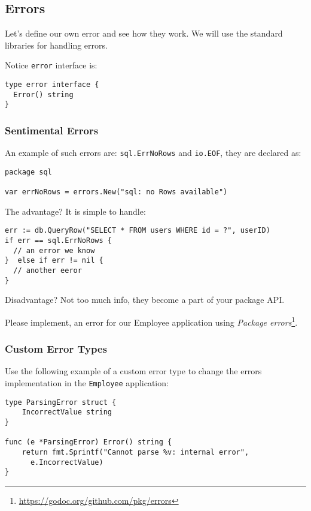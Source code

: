 \documentclass[11pt, letterpaper]{article}
\begin{document}
\subsection{Errors}
Let's define our own error and see how they work. We will use the standard libraries for handling errors.

Notice \verb|error| interface is:

\begin{verbatim}
type error interface {
  Error() string
}
\end{verbatim}

\subsubsection{Sentimental Errors}

An example of such errors are: \texttt{sql.ErrNoRows} and \texttt{io.EOF}, they are declared as:

\begin{verbatim}
package sql

var errNoRows = errors.New("sql: no Rows available")
\end{verbatim}

The advantage? It is simple to handle:

\begin{verbatim}
err := db.QueryRow("SELECT * FROM users WHERE id = ?", userID)
if err == sql.ErrNoRows {
  // an error we know
}  else if err != nil { 
  // another eeror
}
\end{verbatim}

Disadvantage? Not too much info, they become a part of your package API.

\bigskip

Please implement, an error for our Employee application using \emph{Package errors}\footnote{\href{https://godoc.org/github.com/pkg/errors}{https://godoc.org/github.com/pkg/errors}}.

\subsubsection{Custom Error Types}

Use the following example of a custom error type to change the errors implementation in the \verb|Employee| application:

\begin{verbatim}
type ParsingError struct {
    IncorrectValue string
}

func (e *ParsingError) Error() string {
    return fmt.Sprintf("Cannot parse %v: internal error",
      e.IncorrectValue)
}
\end{verbatim}
\end{document}
